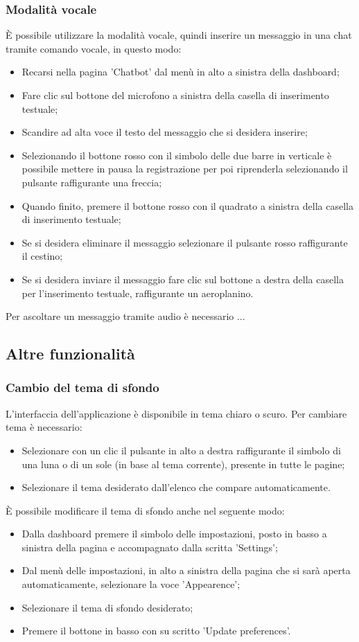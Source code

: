 \documentclass[10pt, a4paper]{article}
\begin{document}
\subsubsection{Modalità vocale}
È possibile utilizzare la modalità vocale, quindi inserire un messaggio in una chat tramite comando vocale, in questo modo:
\begin{itemize}
    \item Recarsi nella pagina 'Chatbot' dal menù in alto a sinistra della dashboard;
    \item Fare clic sul bottone del microfono a sinistra della casella di inserimento testuale;
    \item Scandire ad alta voce il testo del messaggio che si desidera inserire;
    \item Selezionando il bottone rosso con il simbolo delle due barre in verticale è possibile mettere in pausa la registrazione per poi riprenderla selezionando il pulsante raffigurante una freccia;
    \item Quando finito, premere il bottone rosso con il quadrato a sinistra della casella di inserimento testuale;
    \item Se si desidera eliminare il messaggio selezionare il pulsante rosso raffigurante il cestino;
    \item Se si desidera inviare il messaggio fare clic sul bottone a destra della casella per l'inserimento testuale, raffigurante un aeroplanino.
\end{itemize}
Per ascoltare un messaggio tramite audio è necessario ...

\subsection{Altre funzionalità}
\subsubsection{Cambio del tema di sfondo}
L'interfaccia dell'applicazione è disponibile in tema chiaro o scuro. Per cambiare tema è necessario:
\begin{itemize}
    \item Selezionare con un clic il pulsante in alto a destra raffigurante il simbolo di una luna o di un sole (in base al tema corrente), presente in tutte le pagine;
    \item Selezionare il tema desiderato dall'elenco che compare automaticamente.
\end{itemize}
È possibile modificare il tema di sfondo anche nel seguente modo:
\begin{itemize}
    \item Dalla dashboard premere il simbolo delle impostazioni, posto in basso a sinistra della pagina e accompagnato dalla scritta 'Settings';
    \item Dal menù delle impostazioni, in alto a sinistra della pagina che si sarà aperta automaticamente, selezionare la voce 'Appearence';
    \item Selezionare il tema di sfondo desiderato;
    \item Premere il bottone in basso con su scritto 'Update preferences'.
\end{itemize}
\end{document}
